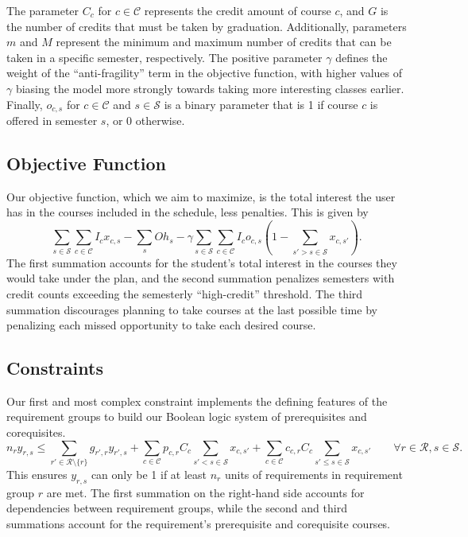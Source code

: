 \documentclass[12pt]{article}
\renewcommand{\S}{\mathcal{S}}
\renewcommand{\R}{\mathcal{R}}
\renewcommand{\C}{\mathcal{C}}
\begin{document}
The parameter $C_c$ for $c\in\C$ represents the credit amount of course $c$, and $G$ is the number of credits that must be taken by graduation.
Additionally, parameters $m$ and $M$ represent the minimum and maximum number of credits that can be taken in a specific semester, respectively.
The positive parameter $\gamma$ defines the weight of the ``anti-fragility'' term in the objective function, with higher values of $\gamma$ biasing the model more strongly towards taking more interesting classes earlier.
Finally, $o_{c,s}$ for $c\in\C$ and $s\in\S$ is a binary parameter that is 1 if course $c$ is offered in semester $s$, or 0 otherwise.

\subsection{Objective Function}

Our objective function, which we aim to maximize, is the total interest the user has in the courses included in the schedule, less penalties. This is given by
\begin{equation*}
    \sum_{s\in\S}\sum_{c\in\C} I_c x_{c,s} - \sum_{s}Oh_s - \gamma\sum_{s\in\S}\sum_{c\in\C} I_co_{c,s}\left(1-\sum_{s'>s\in\S}x_{c,s'}\right).
\end{equation*}
The first summation accounts for the student's total interest in the courses they would take under the plan, and the second summation penalizes semesters with credit counts exceeding the semesterly ``high-credit'' threshold.
The third summation discourages planning to take courses at the last possible time by penalizing each missed opportunity to take each desired course.

\subsection{Constraints}

Our first and most complex constraint implements the defining features of the requirement groups to build our Boolean logic system of prerequisites and corequisites.
\begin{equation*}
    n_r y_{r,s} \le \sum_{r'\in\R\setminus\{r\}} g_{r',r} y_{r',s}
    + \sum_{c\in\C} p_{c,r} C_{c} \sum_{s'<s\in\S} x_{c,s'}
    + \sum_{c\in\C} c_{c,r} C_{c} \sum_{s'\le s\in\S} x_{c,s'}
    \qquad\forall r\in\R, s\in\S.
\end{equation*}
This ensures $y_{r,s}$ can only be 1 if at least $n_r$ units of requirements in requirement group $r$ are met.
The first summation on the right-hand side accounts for dependencies between requirement groups, while the second and third summations account for the requirement's prerequisite and corequisite courses.
\end{document}
